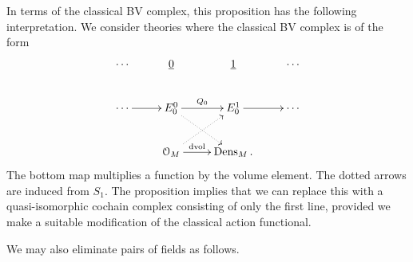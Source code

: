 \documentclass[10pt, oneside]{article}
\begin{document}
\begin{remark}
In terms of the classical BV complex, this proposition has the following interpretation.  We consider theories where the classical BV complex is of the form
\[\xymatrix{
\cdots & \ul{0} & \ul{1} & \cdots \\
\cdots \ar[r] & E_0^0 \ar[r]^{Q_0} \ar@{.>}[dr] & E_0^1 \ar[r] &\cdots \\
&\cO_M \ar^-{{\rm dvol}}[r] \ar@{.>}[ur] &\dens_M. &
}\]
The bottom map multiplies a function by the volume element.
The dotted arrows are induced from $S_1$.
The proposition implies that we can replace this with a quasi-isomorphic cochain complex consisting of only the first line, provided we make a suitable modification of the classical action functional. 
\end{remark}


We may also eliminate pairs of fields as follows.
\end{document}
